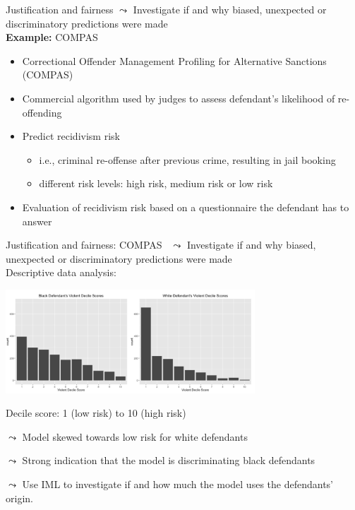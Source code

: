 \documentclass[11pt,compress,t,notes=noshow, aspectratio=169, xcolor=table]{beamer}
\begin{document}
\begin{frame}{Justification and fairness}
    $\leadsto$ Investigate if and why biased, unexpected or discriminatory predictions were made \\
    \bigskip
    \textbf{Example:} COMPAS
    \smallskip
    \begin{itemize}
        \item Correctional Offender Management Profiling for Alternative Sanctions (COMPAS)
        \smallskip
        \item Commercial algorithm used by judges to assess defendant’s likelihood of re-offending
        \pause
        \smallskip
        \item Predict recidivism risk
        \begin{itemize}
            \item i.e., criminal re-offense after previous crime, resulting in jail booking
            \smallskip
            \item different risk levels: high risk, medium risk or low risk
        \end{itemize}
        \pause
        \smallskip
        \item Evaluation of recidivism risk based on a questionnaire the defendant has to answer
    \end{itemize}

\end{frame}

\begin{frame}{Justification and fairness: COMPAS~}
    $\leadsto$ Investigate if and why biased, unexpected or discriminatory predictions were made \\
    \medskip
    Descriptive data analysis: 
    
    \centering
    \includegraphics[width=0.7\textwidth]{figure/compass_black_white.PNG}

    Decile score: 1 (low risk) to 10 (high risk)

	$\leadsto$ Model skewed towards low risk for white defendants
	
	$\leadsto$ Strong indication that the model is discriminating black defendants
	
	$\leadsto$ Use IML to investigate if and how much the model uses the defendants' origin.
\end{frame}
\end{document}
